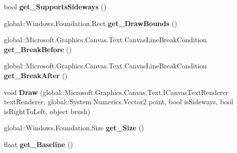 \begin{DoxyCompactItemize}
bool {\bfseries get\+\_\+\+Supports\+Sideways} ()
\item 
\mbox{\label{interface_microsoft_1_1_graphics_1_1_canvas_1_1_text_1_1_i_canvas_text_inline_object_a7e6302b6465f8d6f7772aa52547cefc2}} 
global\+::\+Windows.\+Foundation.\+Rect {\bfseries get\+\_\+\+Draw\+Bounds} ()
\item 
\mbox{\label{interface_microsoft_1_1_graphics_1_1_canvas_1_1_text_1_1_i_canvas_text_inline_object_ab4d7471230758ba37f78405c4601e84c}} 
global\+::\+Microsoft.\+Graphics.\+Canvas.\+Text.\+Canvas\+Line\+Break\+Condition {\bfseries get\+\_\+\+Break\+Before} ()
\item 
\mbox{\label{interface_microsoft_1_1_graphics_1_1_canvas_1_1_text_1_1_i_canvas_text_inline_object_a4448b603d3b5124efb75f573cbb18a73}} 
global\+::\+Microsoft.\+Graphics.\+Canvas.\+Text.\+Canvas\+Line\+Break\+Condition {\bfseries get\+\_\+\+Break\+After} ()
\item 
\mbox{\label{interface_microsoft_1_1_graphics_1_1_canvas_1_1_text_1_1_i_canvas_text_inline_object_a00030cc74b4e29c52023687b4c2c3dc8}} 
void {\bfseries Draw} (global\+::\+Microsoft.\+Graphics.\+Canvas.\+Text.\+I\+Canvas\+Text\+Renderer text\+Renderer, global\+::\+System.\+Numerics.\+Vector2 point, bool is\+Sideways, bool is\+Right\+To\+Left, object brush)
\item 
\mbox{\label{interface_microsoft_1_1_graphics_1_1_canvas_1_1_text_1_1_i_canvas_text_inline_object_abdd46513229ae92a984fb38a29523eee}} 
global\+::\+Windows.\+Foundation.\+Size {\bfseries get\+\_\+\+Size} ()
\item 
\mbox{\label{interface_microsoft_1_1_graphics_1_1_canvas_1_1_text_1_1_i_canvas_text_inline_object_a60131c69d543427c072b80153dd7e4e9}} 
float {\bfseries get\+\_\+\+Baseline} ()
\item 

\end{DoxyCompactItemize}
